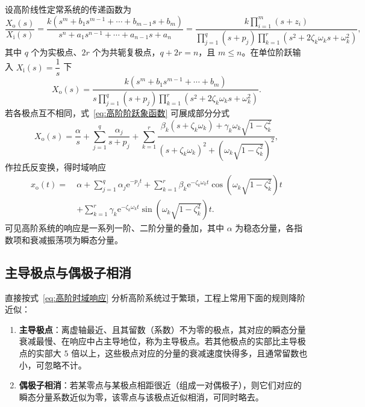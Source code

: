 设高阶线性定常系统的传递函数为
\begin{equation}
\frac{X_{\mathrm{o}}(s)}{X_{\mathrm{i}}(s)}
=\frac{k\left(s^{m}+b_{1}s^{m-1}+\cdots+b_{m-1}s+b_{m}\right)}{s^{n}+a_{1}s^{n-1}+\cdots+a_{n-1}s+a_{n}}
=\frac{k\prod_{i=1}^{m}\left(s+z_{i}\right)}
{\prod_{j=1}^{q}\left(s+p_{j}\right)\prod_{k=1}^{r}\left(s^{2}+2\zeta_{k}\omega_{k}s+\omega_{k}^{2}\right)},
\label{eq:高阶传递函数}
\end{equation}
其中 $q$ 个为实极点、$2r$ 个为共轭复极点，$q+2r=n$，且 $m\le n$。在单位阶跃输入 $X_{\mathrm{i}}(s)=\dfrac{1}{s}$ 下
\begin{equation}
X_{\mathrm{o}}(s)=\frac{k\left(s^{m}+b_{1}s^{m-1}+\cdots+b_{m}\right)}
{s\prod_{j=1}^{q}\left(s+p_{j}\right)\prod_{k=1}^{r}\left(s^{2}+2\zeta_{k}\omega_{k}s+\omega_{k}^{2}\right)}.
\label{eq:高阶阶跃象函数}
\end{equation}
若各极点互不相同，式~\eqref{eq:高阶阶跃象函数} 可展成部分分式
\begin{equation}
X_{\mathrm{o}}(s)=\frac{\alpha}{s}+\sum_{j=1}^{q}\frac{\alpha_{j}}{s+p_{j}}
+\sum_{k=1}^{r}\frac{\beta_{k}\left(s+\zeta_{k}\omega_{k}\right)+\gamma_{k}\omega_{k}\sqrt{1-\zeta_{k}^{2}}}
{\left(s+\zeta_{k}\omega_{k}\right)^{2}+\left(\omega_{k}\sqrt{1-\zeta_{k}^{2}}\right)^{2}},
\label{eq:高阶部分分式}
\end{equation}
作拉氏反变换，得时域响应
\begin{equation}
\begin{aligned}
x_{\mathrm{o}}(t)=\ & \alpha+\sum_{j=1}^{q}\alpha_{j}\mathrm{e}^{-p_{j}t}
+\sum_{k=1}^{r}\beta_{k}\mathrm{e}^{-\zeta_{k}\omega_{k}t}\cos\left(\omega_{k}\sqrt{1-\zeta_{k}^{2}}\right)t\\
& +\sum_{k=1}^{r}\gamma_{k}\mathrm{e}^{-\zeta_{k}\omega_{k}t}\sin\left(\omega_{k}\sqrt{1-\zeta_{k}^{2}}\right)t.
\end{aligned}
\label{eq:高阶时域响应}
\end{equation}
可见高阶系统的响应是一系列一阶、二阶分量的叠加，其中 $\alpha$ 为稳态分量，各指数项和衰减振荡项为瞬态分量。

\subsection{主导极点与偶极子相消}
\label{sec:主导极点}

直接按式~\eqref{eq:高阶时域响应} 分析高阶系统过于繁琐，工程上常用下面的规则降阶近似：

\begin{keybox}[高阶系统简化的两条规则]
\begin{enumerate}
\item \textbf{主导极点}：离虚轴最近、且其留数（系数）不为零的极点，其对应的瞬态分量衰减最慢、在响应中占主导地位，称为主导极点。若其他极点的实部比主导极点的实部大 $5$ 倍以上，这些极点对应的分量的衰减速度快得多，且通常留数也小，可忽略不计。
\item \textbf{偶极子相消}：若某零点与某极点相距很近（组成一对偶极子），则它们对应的瞬态分量系数近似为零，该零点与该极点近似相消，可同时略去。
\end{enumerate}
\end{keybox}

